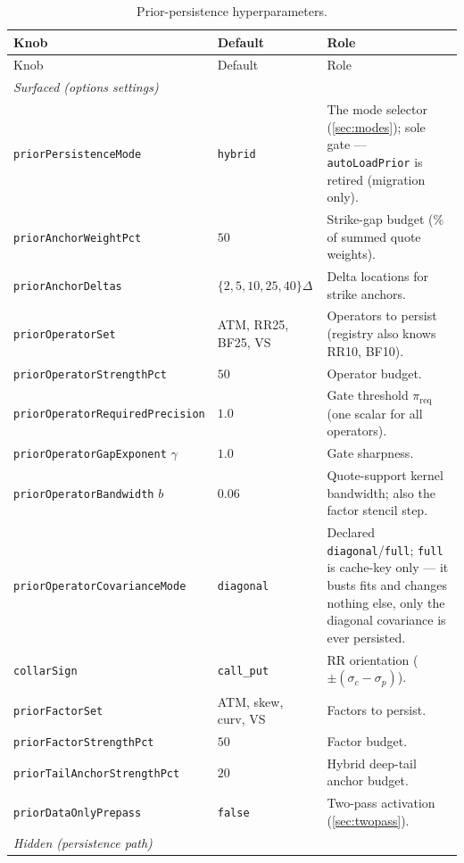 \documentclass[11pt]{article}
\begin{document}
\small
\setlength{\tabcolsep}{4pt}
\begin{longtable}{p{}p{}p{}}
\caption{Prior-persistence hyperparameters.}\label{tab:atlas}\\
\toprule Knob & Default & Role\\ \midrule
\endfirsthead \toprule Knob & Default & Role\\ \midrule \endhead
\multicolumn{3}{l}{\emph{Surfaced (options settings)}}\\ \midrule
\texttt{priorPersistenceMode} & \texttt{hybrid} & The mode selector
(\cref{sec:modes}); sole gate --- \texttt{autoLoadPrior} is retired
(migration only).\\
\texttt{priorAnchorWeightPct} & $50$ & Strike-gap budget (\% of summed
quote weights).\\
\texttt{priorAnchorDeltas} & $\{2,5,10,25,40\}\Delta$ & Delta
locations for strike anchors.\\
\texttt{priorOperatorSet} & ATM, RR25, BF25, VS & Operators to persist
(registry also knows RR10, BF10).\\
\texttt{priorOperatorStrengthPct} & $50$ & Operator budget.\\
\texttt{priorOperatorRequiredPrecision} & $1.0$ & Gate threshold
$\pi_{\mathrm{req}}$ (one scalar for all operators).\\
\texttt{priorOperatorGapExponent} $\gamma$ & $1.0$ & Gate sharpness.\\
\texttt{priorOperatorBandwidth} $b$ & $0.06$ & Quote-support kernel
bandwidth; also the factor stencil step.\\
\texttt{priorOperatorCovarianceMode} & \texttt{diagonal} & Declared
\texttt{diagonal}/\texttt{full}; \texttt{full} is cache-key only ---
it busts fits and changes nothing else, only the diagonal covariance is
ever persisted.\\
\texttt{collarSign} & \texttt{call\_put} & RR orientation
($\pm(\sigma_c-\sigma_p)$).\\
\texttt{priorFactorSet} & ATM, skew, curv, VS & Factors to persist.\\
\texttt{priorFactorStrengthPct} & $50$ & Factor budget.\\
\texttt{priorTailAnchorStrengthPct} & $20$ & Hybrid deep-tail anchor
budget.\\
\texttt{priorDataOnlyPrepass} & \texttt{false} & Two-pass activation
(\cref{sec:twopass}).\\
\midrule
\multicolumn{3}{l}{\emph{Hidden (persistence path)}}\\ \midrule

\end{longtable}
\end{document}
